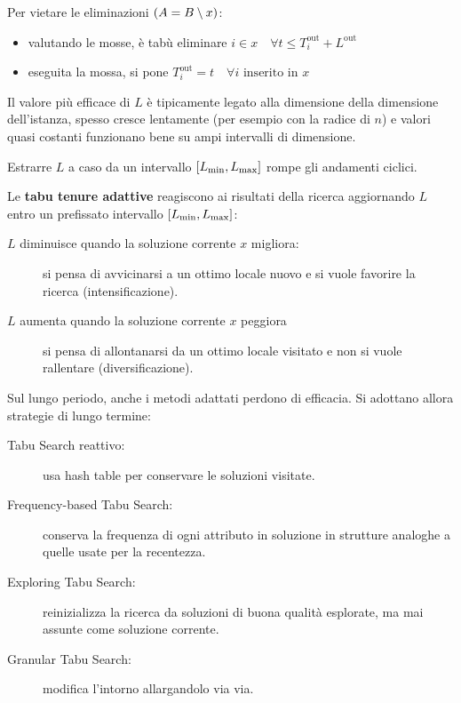 \documentclass[\main/main.tex]{subfiles}
\begin{document}
\begin{multicols}{2}
\begin{observation}
    Per vietare le eliminazioni \(\left(A = B \setminus x\right)\):
    \begin{itemize}
        \item valutando le mosse, è tabù eliminare \(i \in x \quad \forall t \leq T_i^{\text{out}} + L^{\text{out}}\)
        \item eseguita la mossa, si pone \(T_{i}^{\text{out}} = t \quad \forall i \text{ inserito in } x\)
    \end{itemize}
\end{observation}
\begin{observation}
    Il valore più efficace di \(L\) è tipicamente legato alla dimensione della dimensione dell'istanza, spesso cresce lentamente (per esempio con la radice di \(n\)) e valori quasi costanti funzionano bene su ampi intervalli di dimensione.

    Estrarre \(L\) a caso da un intervallo \(\left[L_{\min}, L_{\max}\right]\) rompe gli andamenti ciclici.
    
    Le \textbf{tabu tenure adattive} reagiscono ai risultati della ricerca aggiornando \(L\) entro un prefissato intervallo \(\left[L_{\min}, L_{\max}\right]\):
    \begin{description}
    \item[\(L\) diminuisce quando la soluzione corrente \(x\) migliora:] si pensa di avvicinarsi a un ottimo locale nuovo e si vuole favorire la ricerca (intensificazione).
    \item[\(L\) aumenta quando la soluzione corrente \(x\) peggiora] si pensa di allontanarsi da un ottimo locale visitato e non si vuole rallentare (diversificazione).
    \end{description}
\end{observation}
\begin{observation}
    Sul lungo periodo, anche i metodi adattati perdono di efficacia. Si adottano allora strategie di lungo termine:
    \begin{description}
        \item[Tabu Search reattivo:] usa hash table per conservare le soluzioni visitate.
        \item[Frequency-based Tabu Search:] conserva la frequenza di ogni attributo in soluzione in strutture analoghe a quelle usate per la recentezza.
        \item[Exploring Tabu Search:] reinizializza la ricerca da soluzioni di buona qualità esplorate, ma mai assunte come soluzione corrente.
        \item[Granular Tabu Search:] modifica l'intorno allargandolo via via.
    \end{description}
\end{observation}
\end{multicols}
\end{document}
